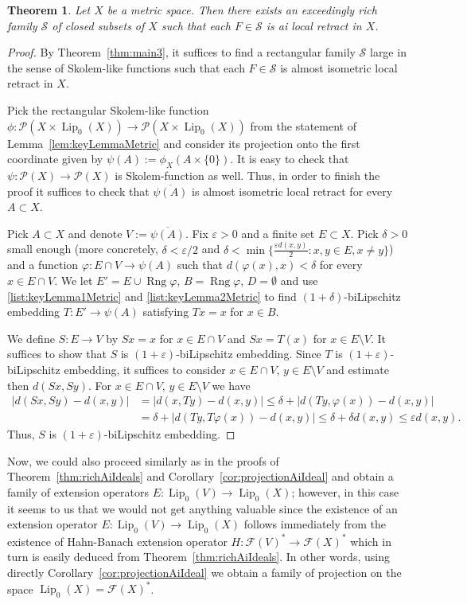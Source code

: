 \documentclass[11pt]{amsart}
\newtheorem{thm}{Theorem}
\theoremstyle{definition}
\theoremstyle{remark}
\newcommand{\F}{\mathcal F}
\newcommand{\PP}{\mathcal P}
\newcommand{\SSS}{\mathcal S}
\def \rng {\operatorname{Rng}}
\def \Lip {\operatorname{Lip}}
\begin{document}
\begin{thm}\label{Thm:ExeedRichFamilyMetric}Let $X$ be a metric space. Then there exists an exceedingly rich family $\SSS$ of closed subsets of $X$ such that each $F\in \SSS$ is ai local retract in $X$.
\end{thm}
\begin{proof}By Theorem~\ref{thm:main3}, it suffices to find a rectangular family $\SSS$ large in the sense of Skolem-like functions such that each $F\in \SSS$ is almost isometric local retract in $X$.

Pick the rectangular Skolem-like function $\phi:\PP(X\times \Lip_0(X))\to \PP(X\times \Lip_0(X))$ from the statement of Lemma~\ref{lem:keyLemmaMetric} and consider its projection onto the first coordinate given by $\psi(A):=\phi_X(A\times \{0\})$. It is easy to check that $\psi:\PP(X)\to \PP(X)$ is Skolem-function as well. Thus, in order to finish the proof it suffices to check that $\overline{\psi(A)}$ is almost isometric local retract for every $A\subset X$.

Pick $A\subset X$ and denote $V:=\overline{\psi(A)}$. Fix $\varepsilon>0$ and a finite set $E\subset X$. Pick $\delta>0$ small enough (more concretely, $\delta < \varepsilon/2$ and $\delta<\min\{\tfrac{\varepsilon d(x,y)}{2}\colon x,y\in E, x\neq y\}$) and a function $\varphi:E\cap V \to \psi(A)$ such that $d(\varphi(x),x)<\delta$ for every $x\in E\cap V$. We let $E' = E\cup \rng \varphi$, $B=\rng \varphi$, $D= \emptyset$ and use \ref{list:keyLemma1Metric} and \ref{list:keyLemma2Metric} to find $(1+\delta)$-biLipschitz embedding $T:E'\to \psi(A)$ satisfying $Tx=x$ for $x\in B$.

We define $S:E\to V$ by $Sx = x$ for $x\in E\cap V$ and $Sx = T(x)$ for $x\in E\setminus V$. It suffices to show that $S$ is $(1+\varepsilon)$-biLipschitz embedding. Since $T$ is $(1+\varepsilon)$-biLipschitz embedding, it suffices to consider $x\in E\cap V$, $y\in E\setminus V$ and estimate then $d(Sx,Sy)$. For $x\in E\cap V$, $y\in E\setminus V$ we have
\[\begin{split}
|d(Sx,Sy) - d(x,y)| & = |d(x,Ty) - d(x,y)|\leq \delta +  |d(Ty,\varphi(x)) - d(x,y)|\\
& = \delta +  |d(Ty,T\varphi(x)) - d(x,y)|\leq \delta + \delta d(x,y)\leq \varepsilon d(x,y).
\end{split}\]
Thus, $S$ is $(1+\varepsilon)$-biLipschitz embedding.
\end{proof}

Now, we could also proceed similarly as in the proofs of Theorem~\ref{thm:richAiIdeals} and Corollary~\ref{cor:projectionAiIdeal} and obtain a family of extension operators $E:\Lip_0(V)\to \Lip_0(X)$; however, in this case it seems to us that we would not get anything valuable since the existence of an extension operator $E:\Lip_0(V)\to \Lip_0(X)$ follows immediately from the existence of Hahn-Banach extension operator $H:\F(V)^*\to \F(X)^*$ which in turn is easily deduced from Theorem~\ref{thm:richAiIdeals}. In other words, using directly Corollary~\ref{cor:projectionAiIdeal} we obtain a family of projection on the space $\Lip_0(X) = \F(X)^*$.
\end{document}
